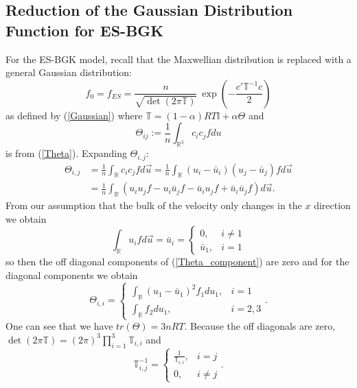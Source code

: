 \subsection{Reduction of the Gaussian Distribution Function for ES-BGK}
For the ES-BGK model, recall that the Maxwellian distribution is replaced with a general Gaussian distribution:
%
\begin{equation}
\label{fES}
f_0 = f_{ES} = \frac{n}{\sqrt{\det{\left(2 \pi \mathbb{T}\right)}}} \ \exp{\left(-\frac{c' \mathbb{T}^{-1} c}{2} \right)}
\end{equation}
%
as defined by (\ref{Gaussian}) where $\mathbb{T} = (1 - \alpha) RT \mathbb{I} + \alpha \Theta$ and
%
\begin{equation}
\label{Theta_component}
\Theta_{ij} := \frac{1}{n} \int_{\mathbb{R}^{3}} c_i c_j f du
\end{equation}
%
is from (\ref{Theta}). Expanding $\Theta_{i,j}$:
%
\begin{align*}
\Theta_{i,j} &= \frac{1}{n} \int_{\mathbb{R}} c_i c_j f d\vec{u} = \frac{1}{n} \int_{\mathbb{R}} (u_i - \bar{u}_i)(u_j - \bar{u}_j) f d\vec{u}\\
&= \frac{1}{n} \int_{\mathbb{R}} \left( u_i u_j f - u_i \bar{u}_j f - \bar{u}_i u_j f + \bar{u}_i \bar{u}_j f \right) d\vec{u}.
\end{align*}
%
From our assumption that the bulk of the velocity only changes in the $x$ direction we obtain
%
\begin{equation*}
\int_{\mathbb{R}} u_i f d\vec{u} = \bar{u}_i = \left \{ \begin{array}{cc} 0, & i \neq 1\\ \bar{u}_1, & i = 1 \end{array} \right.
\end{equation*}
%
so then the off diagonal components of (\ref{Theta_component}) are zero and for the diagonal components we obtain
%
\begin{equation*}
\Theta_{i,i} = \left \{ \begin{array}{cc} \int_{\mathbb{R}} (u_1 - \bar{u}_1)^2 f_1 du_1, & i = 1\\ \int_{\mathbb{R}} f_2 du_1, & i = 2,3 \end{array} \right..
\end{equation*}
%
One can see that we have $tr(\Theta) = 3 n R T$. Because the off diagonals are zero, $\det(2 \pi \mathbb{T}) = (2 \pi)^3 \prod_{i=1}^3 
\mathbb{T}_{i,i}$ and 
%
\begin{equation*}
\mathbb{T}_{i,j}^{-1} = \left \{ \begin{array}{cc} \frac{1}{\mathbb{T}_{i,i}}, & i=j\\ 0, & i \neq j \end{array} \right. .
\end{equation*}
